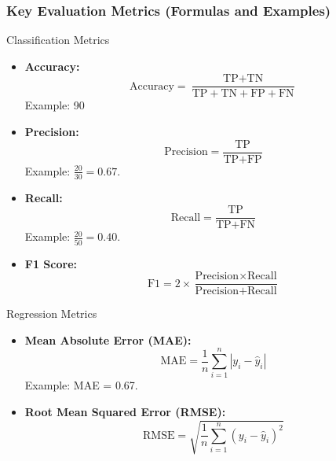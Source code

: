 \documentclass[aspectratio=169]{beamer}
\begin{document}
\begin{frame}[fragile]
    \frametitle{Key Evaluation Metrics (Formulas and Examples)}
    \begin{block}{Classification Metrics}
        \begin{itemize}
            \item \textbf{Accuracy:}
            \[
            \text{Accuracy} = \frac{\text{TP} + \text{TN}}{\text{TP} + \text{TN} + \text{FP} + \text{FN}}
            \]
            Example: 90%
            
            \item \textbf{Precision:}
            \[
            \text{Precision} = \frac{\text{TP}}{\text{TP} + \text{FP}}
            \]
            Example: \( \frac{20}{30} = 0.67 \).
            
            \item \textbf{Recall:}
            \[
            \text{Recall} = \frac{\text{TP}}{\text{TP} + \text{FN}}
            \]
            Example: \( \frac{20}{50} = 0.40 \).
            
            \item \textbf{F1 Score:}
            \[
            \text{F1} = 2 \times \frac{\text{Precision} \times \text{Recall}}{\text{Precision} + \text{Recall}}
            \]
        \end{itemize}
    \end{block}
    
    \begin{block}{Regression Metrics}
        \begin{itemize}
            \item \textbf{Mean Absolute Error (MAE):}
            \[
            \text{MAE} = \frac{1}{n} \sum_{i=1}^{n} |y_i - \hat{y}_i|
            \]
            Example: MAE = 0.67.
            
            \item \textbf{Root Mean Squared Error (RMSE):}
            \[
            \text{RMSE} = \sqrt{\frac{1}{n} \sum_{i=1}^{n} (y_i - \hat{y}_i)^2}
            \]
        \end{itemize}
    \end{block}
\end{frame}
\end{document}
